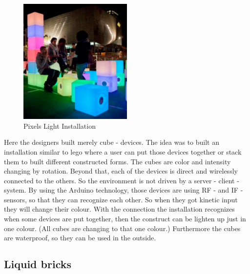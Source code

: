 \begin{figure}[h!]
	\centering
	\includegraphics[width=0.5\textwidth, clip=true, keepaspectratio=true]{./pic/pixels_light_installation.png}
	\caption{Pixels Light Installation}
	\label{fig:pixels_light_installation}
\end{figure}
Here the designers built merely cube - devices. \newline
The idea was to built an installation similar to lego \texttrademark where a user can put those devices together or stack them to built different constructed forms. \newline
The cubes are color and intensity changing by rotation. Beyond that, each of the devices is direct and wirelessly connected to the others. So the environment is not driven by a server - client - system.\newline
By using the Arduino technology, those devices are using RF - and IF - sensors, so that they can recognize each other. So when they got kinetic input they will change their colour. With the connection the installation recognizes when some devices are put together, then the construct can be lighten up just in one colour. (All cubes are changing to that one colour.)\newline
 Furthermore the cubes are waterproof, so they can be used in the outside.\newline
{} \newline

\subsection{Liquid bricks}

